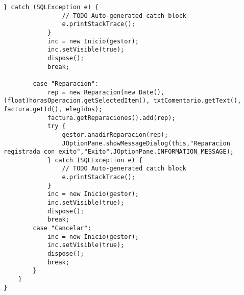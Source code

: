 \begin{lstlisting}[caption=VentanaReparacion.java (App Escritorio)]
			} catch (SQLException e) {
				// TODO Auto-generated catch block
				e.printStackTrace();
			}
			inc = new Inicio(gestor);
			inc.setVisible(true);
			dispose();
			break;
			
		case "Reparacion":
			rep = new Reparacion(new Date(),(float)horasOperacion.getSelectedItem(), txtComentario.getText(), factura.getId(), elegidos);
			factura.getReparaciones().add(rep);
			try {
				gestor.anadirReparacion(rep);
				JOptionPane.showMessageDialog(this,"Reparacion registrada con exito","Exito",JOptionPane.INFORMATION_MESSAGE);
			} catch (SQLException e) {
				// TODO Auto-generated catch block
				e.printStackTrace();
			}
			inc = new Inicio(gestor);
			inc.setVisible(true);
			dispose();
			break;
		case "Cancelar":
			inc = new Inicio(gestor);
			inc.setVisible(true);
			dispose();
			break;
		}	
	}
}
\end{lstlisting}
\clearpage